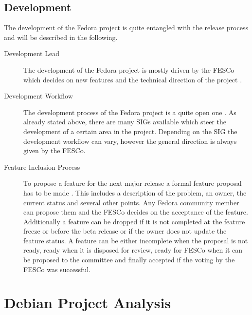 \subsection{Development}

The development of the Fedora project is quite entangled with the release
process and will be described in the following.

\begin{description}

  \item[Development Lead] The development of the Fedora project is mostly
    driven by the \ac{FESCo} which decides on new features and the technical
    direction of the project \cite{FedoraFESCo}.

  \item[Development Workflow] The development process of the Fedora project
    is a quite open one \cite{FedoraReleaseEngineering,FedoraSIG}. As already
    stated above, there are many \acp{SIG} available which steer the
    development of a certain area in the project. Depending on the \ac{SIG}
    the development workflow can vary, however the general direction is
    always given by the \ac{FESCo}.

  \item[Feature Inclusion Process] To propose a feature for the next major
    release a formal feature proposal has to be made
    \cite{FedoraFeatures,FedoraFESCo}. This includes a description of the
    problem, an owner, the current status and several other points. Any
    Fedora community member can propose them and the \ac{FESCo} decides on
    the acceptance of the feature. Additionally a feature can be dropped if
    it is not completed at the feature freeze or before the beta release or
    if the owner does not update the feature status. A feature can be either
    incomplete when the proposal is not ready, ready when it is disposed for
    review, ready for \ac{FESCo} when it can be proposed to the committee and
    finally accepted if the voting by the \ac{FESCo} was successful.

\end{description}


\section{Debian Project Analysis} %


